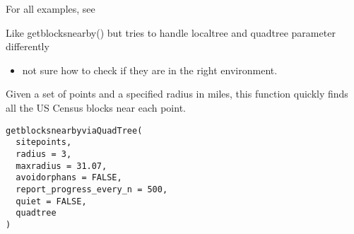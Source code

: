 \documentclass[a4paper]{book}
\begin{document}
%
\begin{Details}\relax
For all examples, see 

Like getblocksnearby() but tries to handle localtree and quadtree parameter differently
\begin{itemize}

\item{} not sure how to check if they are in the right environment.

\end{itemize}

\end{Details}
%
\begin{SeeAlso}\relax
{}
\end{SeeAlso}
%
\begin{Description}\relax
Given a set of points and a specified radius in miles,
this function quickly finds all the US Census blocks near each point.
\end{Description}
%
\begin{Usage}
\begin{verbatim}
getblocksnearbyviaQuadTree(
  sitepoints,
  radius = 3,
  maxradius = 31.07,
  avoidorphans = FALSE,
  report_progress_every_n = 500,
  quiet = FALSE,
  quadtree
)
\end{verbatim}
\end{Usage}
%
\end{document}
